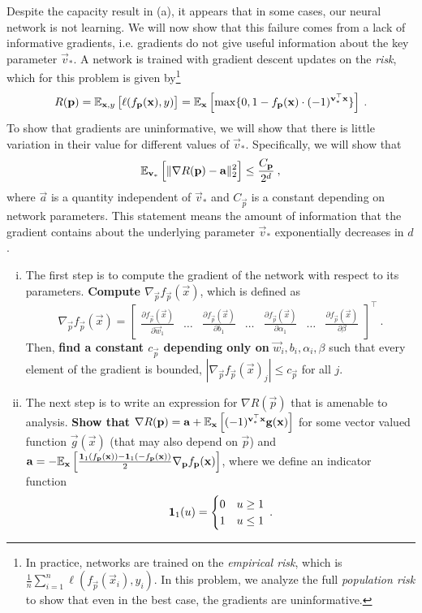 \documentclass[preview]{standalone}
\begin{document}
\begin{Parts}
\Part Despite the capacity result in (a), it appears that in some cases, our neural network is not learning. We will now show that this failure comes from a lack of informative gradients, i.e. gradients do not give useful information about the key parameter $\vec v_*$. A network is trained with gradient descent updates on the \emph{risk}, which for this problem is given by\footnote{
	In practice, networks are trained on the \emph{empirical risk}, which is $\frac{1}{n}\sum_{i=1}^n\ell(f_{\vec p}(\vec x_i), y_i)$. In this problem, we analyze the full \emph{population risk} to show that even in the best case, the gradients are uninformative.
}
\[R(\boldsymbol{\mathbf{p}}) = \mathbb{E}_{\boldsymbol{\mathbf{x}},y}\left[\ell(f_{\boldsymbol{\mathbf{p}}}(\boldsymbol{\mathbf{x}}), y)\right] = \mathbb{E}_{\boldsymbol{\mathbf{x}}}\left[\max\{0,1-f_{\boldsymbol{\mathbf{p}}}(\boldsymbol{\mathbf{x}})\cdot (-1)^{\boldsymbol{\mathbf{v}}_*^\top \boldsymbol{\mathbf{x}}}\} \right]\:.\]
To show that gradients are uninformative, we will show that there is little variation in their value for different values of $\vec v_*$.
Specifically, we will show that
\[\mathbb{E}_{\boldsymbol{\mathbf{v}}_*}\left[\|\nabla R(\boldsymbol{\mathbf{p}}) - \boldsymbol{\mathbf{a}}\|_2^2\right] \leq \frac{C_{\boldsymbol{\mathbf{p}}}}{2^d}\:,\]
where $\vec a$ is a quantity independent of $\vec v_*$ and $C_{\vec{p}}$ is a constant depending on network parameters. 
This statement means the amount of information that the gradient contains about the underlying parameter $\vec v_*$ exponentially decreases in $d$.
\begin{enumerate}[(i)]
\item The first step is to compute the gradient of the network with respect to its parameters.
{\bf Compute $\nabla_{\vec p} f_{\vec p}(\vec x)$}, which is defined as
\[\nabla_{\vec p} f_{\vec p}(\vec x) = 
\begin{bmatrix}
\frac{\partial f_{\vec p}(\vec x)}{\partial \vec w_{1}} 
 & \dots &
\frac{\partial f_{\vec p}(\vec x)}{\partial b_{1}}
 & \dots &
\frac{\partial f_{\vec p}(\vec x)}{\partial \alpha_{1}}
 & \dots &
\frac{\partial f_{\vec p}(\vec x)}{\partial \beta}
\end{bmatrix}^\top \:.\]
Then, {\bf find a constant $c_{\vec p}$ depending only on} $\vec w_i,b_i,\alpha_i,\beta$ such that every element of the gradient is bounded, $|\nabla_{\vec p} f_{\vec p}(\vec x)_j| \leq c_{\vec p}$ for all $j$.




\item The next step is to write an expression for $\nabla R(\vec p)$ that is amenable to analysis. {\bf Show that} $\nabla R(\boldsymbol{\mathbf{p}}) = \boldsymbol{\mathbf{a}} + \mathbb{E}_{\boldsymbol{\mathbf{x}}}\left[(-1)^{\boldsymbol{\mathbf{v}}_*^\top\boldsymbol{\mathbf{x}}} \boldsymbol{\mathbf{g}}(\boldsymbol{\mathbf{x}})\right]$ for some vector valued function $\vec g(\vec x)$ (that may also depend on $\vec p$) and $\boldsymbol{\mathbf{a}} = -\mathbb{E}_{\boldsymbol{\mathbf{x}}}\left[ \frac{\mathbf{1}_1(f_{\boldsymbol{\mathbf{p}}}(\boldsymbol{\mathbf{x}}))-\mathbf{1}_1(-f_{\boldsymbol{\mathbf{p}}}(\boldsymbol{\mathbf{x}}))}{2} \nabla_{\boldsymbol{\mathbf{p}}}f_{\boldsymbol{\mathbf{p}}}(\boldsymbol{\mathbf{x}}) \right]$, where we define an indicator function
\[\mathbf{1}_1(u) = \begin{cases}0 & u \geq 1\\ 1 & u\leq 1\end{cases}\:.\]


\end{enumerate}
\end{Parts}
\end{document}
